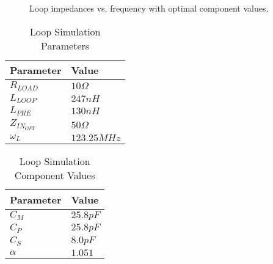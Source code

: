 \newpage
\begin{figure}
    \centering
    
    \caption{Loop impedances vs. frequency with optimal component values.}
    \label{fig:impedance_plot}
\end{figure}

\begin{table}[]
\centering
\caption{Loop Simulation Parameters}
\label{tab:sim_independent}
\begin{tabular}{|l|l|}
\hline
Parameter  & Value       \\
\hline
$R_{LOAD}$ & $10\Omega$  \\
$L_{LOOP}$ & $247nH$     \\
$L_{PRE}$  & $130nH$     \\
$Z_{IN_{OPT}}$  & $50\Omega$     \\
$\omega_L$ & $123.25MHz$ \\
\hline
\end{tabular}
\end{table}

\begin{table}[]
\centering
\caption{Loop Simulation Component Values}
\label{tab:sim_dependent}
\begin{tabular}{|l|l|}
\hline
Parameter & Value       \\
\hline
$C_M$     & $25.8pF$  \\
$C_P$     & $25.8pF$     \\
$C_S$     & $8.0pF$     \\
$\alpha$  & $1.051$ \\
\hline
\end{tabular}
\end{table}
